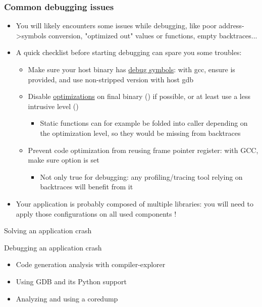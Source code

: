 \begin{frame}[fragile]
  \frametitle{Common debugging issues}
  \begin{itemize}
    \item You will likely encounters some issues while debugging, like poor address->symbols conversion, "optimized out" values or functions, empty backtraces...
    \item A quick checklist before starting debugging can spare you some troubles:
    \begin{itemize}
      \item Make sure your host binary has \href{https://gcc.gnu.org/onlinedocs/gcc/Debugging-Options.html}{debug symbols}: with gcc, ensure  is provided, and use non-stripped version with host gdb
      \item Disable \href {https://gcc.gnu.org/onlinedocs/gcc-4.9.2/gcc/Optimize-Options.html}{optimizations} on final binary () if possible, or at least use a less intrusive level ()
      \begin {itemize}
        \item Static functions can for example be folded into caller depending on the optimization level, so they would be missing from backtraces
    \end{itemize}
      \item Prevent code optimization from reusing frame pointer register: with GCC, make sure  option is set
        \begin{itemize}
          \item Not only true for debugging: any profiling/tracing tool relying on backtraces will benefit from it
        \end{itemize}
    \end{itemize}
    \item Your application is probably composed of multiple libraries: you will need to apply those configurations on all used components !
  \end{itemize}
\end{frame}

\setuplabframe
{Solving an application crash}
{
  Debugging an application crash
  \begin{itemize}
    \item Code generation analysis with compiler-explorer
    \item Using GDB and its Python support
    \item Analyzing and using a coredump
  \end{itemize}
}
